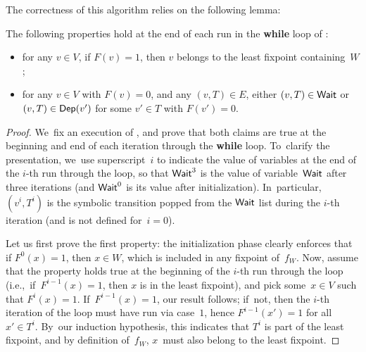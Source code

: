 The correctness of this algorithm relies on the following lemma:
\begin{lemma}[\cite{LS98}]\label{9-lemma:ls98}
  The following properties hold at the end of each run in the
  \textbf{while} loop of :
  \begin{itemize}
  \item for any $v\in V$, if $F(v)=1$, then $v$ belongs to the least
    fixpoint containing~$W$;
  \item for any $v\in V$ with $F(v)=0$, and any $(v,T)\in E$, either
    $(v,T)\in \textsf{Wait}$ or $(v,T)\in\textsf{Dep}(v')$ for some $v'\in T$ with
    $F(v')=0$.
  \end{itemize}
\end{lemma}

\begin{proof}
  We~fix an execution of , and prove that both
  claims are true at the beginning and end of each iteration through
  the \textbf{while} loop. To~clarify the presentation, we~use
  superscript~$i$ to indicate the value of variables at the end of the
  $i$-th run through the loop, so that $\textsf{Wait}^3$ is the value of
  variable~$\textsf{Wait}$ after three iterations (and $\textsf{Wait}^0$ is its value
  after initialization). In~particular, $(v^i,T^i)$ is the
  symbolic transition popped from the $\textsf{Wait}$ list during the $i$-th
  iteration (and is not defined for~$i=0$).

  Let us first prove the first property: the initialization phase
  clearly enforces that if $F^0(x)=1$, then $x\in W$, which is
  included in any fixpoint of~$f_W$. Now, assume that the property
  holds true at the beginning of the $i$-th run through the loop
  (i.e.,~if~$F^{i-1}(x)=1$, then $x$ is in the least fixpoint), and
  pick some~$x\in V$ such that $F^i(x)=1$. If~$F^{i-1}(x)=1$, our
  result follows; if~not, then the $i$-th iteration of the loop must
  have run via case~$1$, hence $F^{i-1}(x')=1$ for all~$x'\in
  T^i$. By~our induction hypothesis, this indicates that $T^i$ is part
  of the least fixpoint, and by definition of~$f_W$, $x$~must also
  belong to the least fixpoint.



\end{proof}
